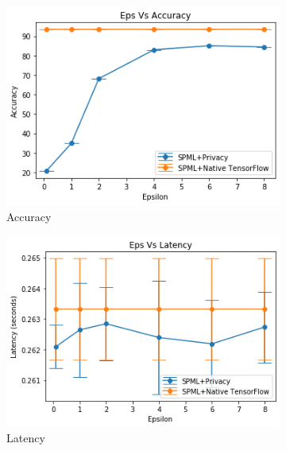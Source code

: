 \begin{figure}
     \begin{subfigure}{0.5\textwidth}
         \includegraphics[width=\textwidth]{images/Inference/MnistNativeAccuracyInference.png}
         \caption{Accuracy}
         \label{fig:appendixnativeMnistAccuracyInference}
     \end{subfigure}
     \begin{subfigure}{0.5\textwidth}
         \includegraphics[width=\textwidth]{images/Inference/MnistNativeLatencyInference.png}
         \caption{Latency}
         \label{fig:appendixnativeMnistLatencyInference}
     \end{subfigure}
        \caption{MNIST Dataset - Inference - Native mode without Intel SGX and SCONE}
     \begin{subfigure}{0.5\textwidth}

\end{subfigure}
\end{figure}
